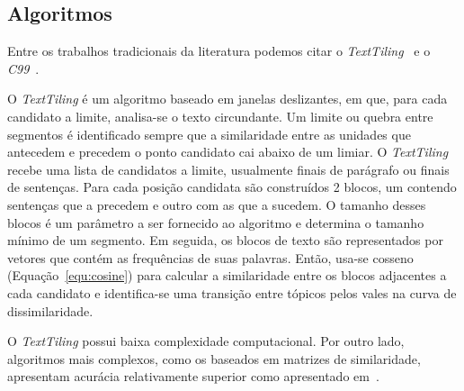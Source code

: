 
\subsection{Algoritmos}
	\label{subsec:principaisalgoritimos}



Entre os trabalhos tradicionais da literatura podemos citar o  \textit{TextTiling}~\cite{Hearst1994} e o \textit{C99}~\cite{Choi2000}.




O \textit{TextTiling} é um algoritmo baseado em janelas deslizantes, em  que, para cada candidato a limite, analisa-se o texto circundante. Um limite ou quebra entre segmentos é identificado sempre que a similaridade entre as unidades que antecedem e precedem o ponto candidato cai abaixo de um limiar. O \textit{TextTiling} recebe uma lista de candidatos a limite, usualmente finais de parágrafo ou finais de sentenças. Para cada posição candidata são construídos 2 blocos, um contendo sentenças que a precedem e outro com as que a sucedem. O tamanho desses blocos é um parâmetro a ser fornecido ao algoritmo e determina o tamanho mínimo de um segmento. Em seguida, os blocos de texto são representados por vetores que contém as frequências de suas palavras. Então, usa-se cosseno (Equação~\ref{equ:cosine}) para calcular a similaridade entre os blocos adjacentes a cada candidato e identifica-se uma transição entre tópicos pelos vales na curva de dissimilaridade.

O \textit{TextTiling} possui baixa complexidade computacional. Por outro lado, algoritmos mais complexos, como os baseados em matrizes de similaridade, apresentam acurácia relativamente superior como apresentado em~\cite{Choi2000, Kern2009, Misra2009}.




